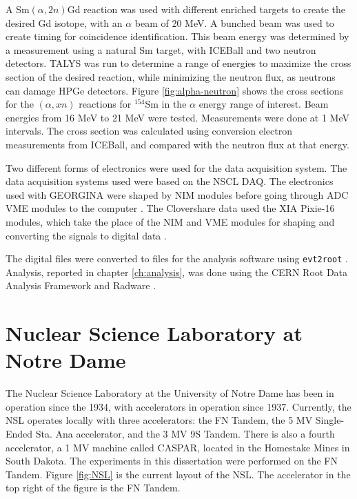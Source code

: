 A Sm$(\alpha,2n)$Gd reaction was used with different enriched targets to create the desired Gd isotope, with an $\alpha$ beam of 20 MeV. A bunched beam was used to create timing for coincidence identification. This beam energy was determined by a measurement using a natural Sm target, with ICEBall and two neutron detectors. TALYS was run to determine a range of energies to maximize the cross section of the desired reaction, while minimizing the neutron flux, as neutrons can damage HPGe detectors. Figure \ref{fig:alpha-neutron} shows the cross sections for the $(\alpha,xn)$ reactions for $^{154}$Sm in the $\alpha$ energy range of interest. Beam energies from 16 MeV to 21 MeV were tested. Measurements were done at 1 MeV intervals. The cross section was calculated using conversion electron measurements from ICEBall, and compared with the neutron flux at that energy.



Two different forms of electronics were used for the data acquisition system. The data acquisition systems used were based on the NSCL DAQ\citep{nscl:_daq,prokop14:_nsclddas}. The electronics used with GEORGINA were shaped by NIM modules before going through ADC VME modules to the computer \citep{mesytec:_ADC,caen:_TDC}. The Clovershare data used the XIA Pixie-16 modules, which take the place of the NIM and VME modules for shaping and converting the signals to digital data \citep{xia:_pixie}.

The digital files were converted to files for the analysis software using \texttt{evt2root} \citep{smith14:_evt2root}. Analysis, reported in chapter \ref{ch:analysis}, was done using the CERN Root Data Analysis Framework and Radware \citep{brun97:_root,radford00:_radware}.

\section{Nuclear Science Laboratory at Notre Dame}

The Nuclear Science Laboratory at the University of Notre Dame has been in operation since the 1934, with accelerators in operation since 1937. Currently, the NSL operates locally with three accelerators: the FN Tandem, the 5 MV Single-Ended Sta. Ana accelerator, and the 3 MV 9S Tandem. There is also a fourth accelerator, a 1 MV machine called CASPAR, located in the Homestake Mines in South Dakota. The experiments in this dissertation were performed on the FN Tandem. Figure \ref{fig:NSL} is the current layout of the NSL. The accelerator in the top right of the figure is the FN Tandem.

